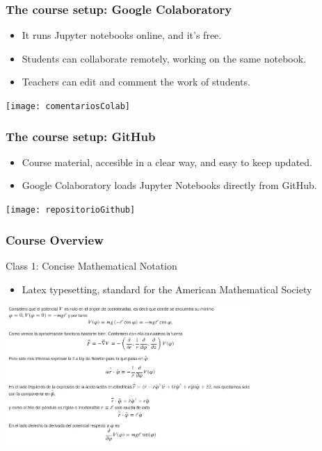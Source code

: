 \documentclass[aspectratio=169]{beamer}
\begin{document}
\begin{frame}
	\frametitle{The course setup: Google Colaboratory}
	\begin{block}{}
		\begin{itemize}
			\item It runs Jupyter notebooks online, and it's free.
			\item Students can collaborate remotely, working on the same notebook.
			\item Teachers can edit and comment the work of students.
		\end{itemize}
	\texttt{[image: comentariosColab]}
	\end{block}
\end{frame}

\begin{frame}
	\frametitle{The course setup: GitHub}
	\begin{block}{}
		\begin{itemize}
			\item Course material, accesible in a clear way, and easy to keep updated.
			\item Google Colaboratory loads Jupyter Notebooks directly from GitHub.
		\end{itemize}
	\texttt{[image: repositorioGithub]}
	\end{block}
\end{frame}

\begin{frame}
	\frametitle{Course Overview}
	Class 1: Concise Mathematical Notation
	\begin{block}{}
		\begin{itemize}
			\item Latex typesetting, standard for the American Mathematical Society
		\end{itemize}
	\includegraphics[width= 0.7\textwidth]{clase1péndulo}
	\end{block}
\end{frame}
\end{document}
